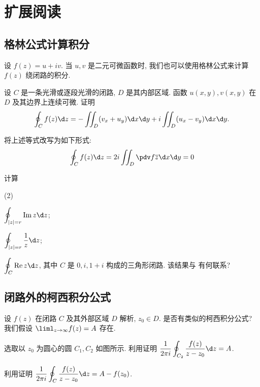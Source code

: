 \newpage
\section{扩展阅读\optional}

\subsection{格林公式计算积分}
设 $f(z)=u+iv$.
当 $u,v$ 是二元可微函数时, 我们也可以使用格林公式来计算 $f(z)$ 绕闭路的积分.


\begin{subex}
  \item 设 $C$ 是一条光滑或逐段光滑的闭路, $D$ 是其内部区域. 函数 $u(x,y),v(x,y)$ 在 $D$ 及其边界上连续可微. 证明
  \[
    \oint_C f(z)\d z=-\iint_D(v_x+u_y)\d x\d y
    +i\iint_D(u_x-v_y)\d x\d y.
  \]
  \item 将上述等式改写为如下形式:
    \[
      \oint_Cf(z)\d z=2i\iint_D\pdv f{\ov z}\d x\d y=0
    \]
  \item 计算
    \begin{subsubex}(2)
      \item $\displaystyle\oint_{|z|=r}\Im z\d z$;
      \item $\displaystyle\oint_{|z|=r}\dfrac 1z\d z$;
      \item* $\displaystyle\oint_{C}\Re z\d z$, 其中 $C$ 是 $0,i,1+i$ 构成的三角形闭路. 该结果与 有何联系?
    \end{subsubex}
\end{subex}


\subsection{闭路外的柯西积分公式}

设 $f(z)$ 在闭路 $C$ 及其外部区域 $D$ 解析, $z_0\in D$. 是否有类似的柯西积分公式?
我们假设 $\liml_{z\to\infty}f(z)=A$ 存在.
\begin{center}
\end{center}
\begin{subex}
  \item 选取以 $z_0$ 为圆心的圆 $C_1,C_2$ 如图所示.
  利用\thmGrowUp 证明 $\displaystyle \frac1{2\pi i}\oint_{C_2}\frac{f(z)}{z-z_0}\d z=A$.
  \item 利用\thmCCC 证明 $\displaystyle \frac1{2\pi i}\oint_C\frac{f(z)}{z-z_0}\d z=A-f(z_0)$.
\end{subex}
